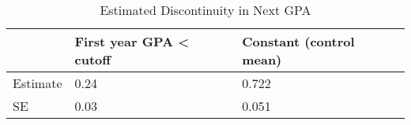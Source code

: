 \begin{table}

\caption{Estimated Discontinuity in Next GPA}
\centering
\begin{tabular}[t]{l|l|l}
\hline
  & First year GPA < cutoff & Constant (control mean)\\
\hline
Estimate & 0.24 & 0.722\\
\hline
SE & 0.03 & 0.051\\
\hline
\end{tabular}
\end{table}
